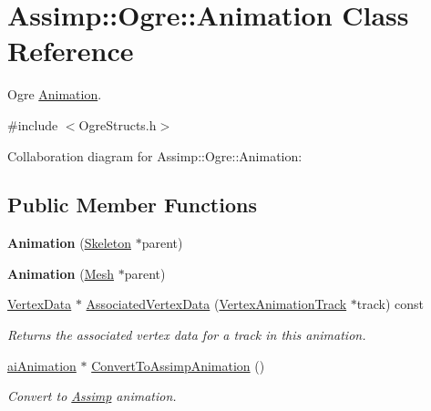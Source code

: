 \hypertarget{class_assimp_1_1_ogre_1_1_animation}{\section{Assimp\+:\+:Ogre\+:\+:Animation Class Reference}
\label{class_assimp_1_1_ogre_1_1_animation}
}


Ogre \hyperlink{class_assimp_1_1_ogre_1_1_animation}{Animation}.  




{\ttfamily \#include $<$Ogre\+Structs.\+h$>$}



Collaboration diagram for Assimp\+:\+:Ogre\+:\+:Animation\+:
\subsection*{Public Member Functions}
\begin{DoxyCompactItemize}
\item 
\hypertarget{class_assimp_1_1_ogre_1_1_animation_aac59f07cb4b90bea25397d6ef5401dbb}{{\bfseries Animation} (\hyperlink{class_assimp_1_1_ogre_1_1_skeleton}{Skeleton} $\ast$parent)}\label{class_assimp_1_1_ogre_1_1_animation_aac59f07cb4b90bea25397d6ef5401dbb}

\item 
\hypertarget{class_assimp_1_1_ogre_1_1_animation_a343bd03f8c28b84638f216897cce683d}{{\bfseries Animation} (\hyperlink{class_assimp_1_1_ogre_1_1_mesh}{Mesh} $\ast$parent)}\label{class_assimp_1_1_ogre_1_1_animation_a343bd03f8c28b84638f216897cce683d}

\item 
\hyperlink{class_assimp_1_1_ogre_1_1_vertex_data}{Vertex\+Data} $\ast$ \hyperlink{class_assimp_1_1_ogre_1_1_animation_a3d9cd47e670d6bc953abef0de1d8f121}{Associated\+Vertex\+Data} (\hyperlink{struct_assimp_1_1_ogre_1_1_vertex_animation_track}{Vertex\+Animation\+Track} $\ast$track) const 
\begin{DoxyCompactList}\small\item\em Returns the associated vertex data for a track in this animation. \end{DoxyCompactList}\item 
\hypertarget{class_assimp_1_1_ogre_1_1_animation_aa330fe459b93ffb7d6033555ea9bb42a}{\hyperlink{structai_animation}{ai\+Animation} $\ast$ \hyperlink{class_assimp_1_1_ogre_1_1_animation_aa330fe459b93ffb7d6033555ea9bb42a}{Convert\+To\+Assimp\+Animation} ()}\label{class_assimp_1_1_ogre_1_1_animation_aa330fe459b93ffb7d6033555ea9bb42a}

\begin{DoxyCompactList}\small\item\em Convert to \hyperlink{class_assimp}{Assimp} animation. \end{DoxyCompactList}\end{DoxyCompactItemize}
